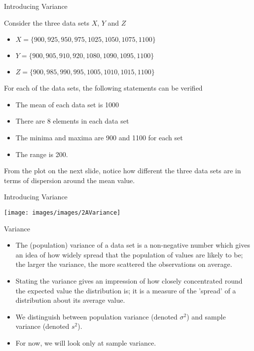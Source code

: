 


{
	{Introducing Variance}

Consider the three data sets $X$, $Y$ and $Z$
\begin{itemize}
\item $X= \{900,925,950,975,1025,1050,1075,1100 \}$
\item $Y=\{900,905,910,920,1080,1090,1095,1100\}$
\item $Z=\{900,985,990,995,1005,1010,1015,1100\}$
\end{itemize}

For each of the data sets, the following statements can be verified

\begin{itemize}
\item The mean of each data set is 1000
\item There are 8 elements in each data set
\item The minima and maxima are 900 and 1100 for each set
\item The range is 200.
\end{itemize}

From the plot on the next slide, notice how different the three data sets are in terms of dispersion around the mean value.

}


{
	{Introducing Variance}


\begin{center}
\texttt{[image: images/images/2AVariance]}
\end{center}

}

{
	{Variance}


\begin{itemize}

\item The (population) variance of a data set is a non-negative number which gives an idea of how widely spread that the population of values are likely to be; the larger the variance, the more scattered the observations on average.
\smallskip
\item Stating the variance gives an impression of how closely concentrated round the expected value the distribution is; it is a measure of the 'spread' of a distribution about its average value.
\smallskip
\item We distinguish between population variance (denoted $\sigma^2$) and sample variance (denoted $s^2$). 
\item For now, we will look only at sample variance.

\end{itemize}

}


